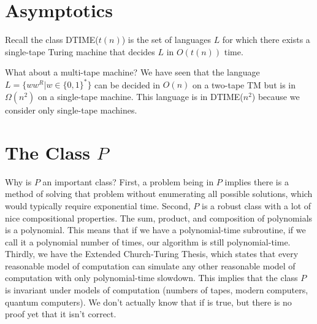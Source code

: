 





\section*{Asymptotics}


Recall the class DTIME($t(n)$) is the set of languages $L$ for which there exists a single-tape Turing machine that decides $L$ in $O(t(n))$ time.

What about a multi-tape machine?  We have seen that the language $L = \{ww^R|w\in\{0,1\}^*\}$ can be decided in $O(n)$ on a two-tape TM but is in $\Omega(n^2)$ on a single-tape machine.  This language is in DTIME($n^2$) because we consider only single-tape machines.

\section*{The Class $P$}


Why is $P$ an important class?  First, a problem being in $P$ implies there is a method of solving that problem without enumerating all possible solutions, which would typically require exponential time.  Second, $P$ is a robust class with a lot of nice compositional properties.  The sum, product, and composition of polynomials is a polynomial.  This means that if we have a polynomial-time subroutine, if we call it a polynomial number of times, our algorithm is still polynomial-time.  Thirdly, we have the Extended Church-Turing Thesis, which states that every reasonable model of computation can simulate any other reasonable model of computation with only polynomial-time slowdown.  This implies that the class $P$ is invariant under models of computation (numbers of tapes, modern computers, quantum computers).  We don't actually know that if is true, but there is no proof yet that it isn't correct.

